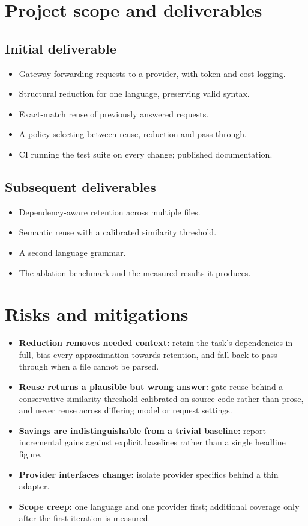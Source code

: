 \documentclass[11pt,a4paper]{article}
\begin{document}
\section{Project scope and deliverables}

\subsection{Initial deliverable}
\begin{itemize}[noitemsep]
  \item Gateway forwarding requests to a provider, with token and cost logging.
  \item Structural reduction for one language, preserving valid syntax.
  \item Exact-match reuse of previously answered requests.
  \item A policy selecting between reuse, reduction and pass-through.
  \item CI running the test suite on every change; published documentation.
\end{itemize}

\subsection{Subsequent deliverables}
\begin{itemize}[noitemsep]
  \item Dependency-aware retention across multiple files.
  \item Semantic reuse with a calibrated similarity threshold.
  \item A second language grammar.
  \item The ablation benchmark and the measured results it produces.
\end{itemize}

\section{Risks and mitigations}

\begin{itemize}[noitemsep]
  \item \textbf{Reduction removes needed context:} retain the task's
        dependencies in full, bias every approximation towards retention, and
        fall back to pass-through when a file cannot be parsed.
  \item \textbf{Reuse returns a plausible but wrong answer:} gate reuse behind a
        conservative similarity threshold calibrated on source code rather than
        prose, and never reuse across differing model or request settings.
  \item \textbf{Savings are indistinguishable from a trivial baseline:} report
        incremental gains against explicit baselines rather than a single
        headline figure.
  \item \textbf{Provider interfaces change:} isolate provider specifics behind a
        thin adapter.
  \item \textbf{Scope creep:} one language and one provider first; additional
        coverage only after the first iteration is measured.
\end{itemize}
\end{document}
